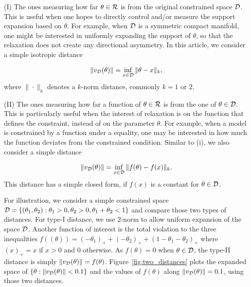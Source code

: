 \documentclass[10pt,fleqn]{article}
\DeclareMathOperator{\1}{\mathbbm{1}} \DeclareMathOperator{\bigO}{\mc O}
\begin{document}
(I) The ones measuring how far $\theta \in \mathcal{R}$ is from the original constrained space $\mathcal{D}$. This is useful when one hopes to directly control and/or measure the support expansion based on $\theta$. For example, when $\mathcal{D}$ is a symmetric compact manifold, one might be interested in uniformly expanding the support of $\theta$, so that the relaxation does not create any directional asymmetry. In this article, we consider a simple isotropic distance

\begin{eqnarray}
\|v_{\mathcal{D}}(\theta)\| = \inf_{x\in\mathcal{D}} \|\theta-x\|_k,
\end{eqnarray}
where $\|\cdot\|_k$ denotes a $k$-norm distance, commonly $k=1$ or $2$.

(II) The ones measuring how far a function of $\theta \in \mathcal{R}$ is from the one of $\theta\in \mathcal{D}$. This is particularly useful when the interest of relaxation is on the function that defines the constraint, instead of on the parameter $\theta$. For example, when a model is constrained by a function under a equality, one may be interested in how much the function deviates from the constrained condition. Similar to (i), we also consider a simple distance

\begin{eqnarray}
\|v_{\mathcal{D}}(\theta)\| = \inf_{x\in\mathcal{D}} \|f(\theta)-f(x)\|_k.
\end{eqnarray}
This distance has a simple closed form, if $f(x)$ is a constant for $\theta\in \mathcal{D}$.

For illustration, we consider a simple constrained space $\mathcal{D}=\{(\theta_1,\theta_2):  \theta_1 >0, \theta_2>0, \theta_1+\theta_2<1\}$ and compare those two types of distances. For type-I distance, we use $2$-norm to allow uniform
expansion of the space $\mathcal{D}$. Another function of interest is the total violation to the three inequalities $f((\theta))= (-\theta_1)_+ + (-\theta_2)_+ + (1-\theta_1-\theta_2)_+$ where $(x)_+ = x$ if $x>0$ and $0$ otherwise. As $f(\theta)=0$ when $\theta\in \mathcal{D}$, the type-II distance is simply
$\|v_{\mathcal{D}}(\theta)\| =f (\theta)$. Figure~\ref{fig:two_distances}
plots the expanded space of $\{\theta: \|v_{\mathcal{D}}(\theta)\|< 0.1\}$ and the values of $f(\theta)$ along $\|v_{\mathcal{D}}(\theta)\| = 0.1$, using those
two distances.
\end{document}
